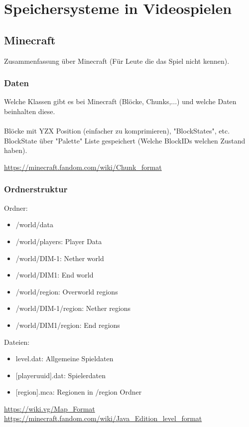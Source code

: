 \chapter{Speichersysteme in Videospielen}\label{ch:videospiele}

\section{Minecraft}
Zusammenfassung über Minecraft (Für Leute die das Spiel nicht kennen).

\subsection{Daten}
Welche Klassen gibt es bei Minecraft (Blöcke, Chunks,...) und welche Daten 
beinhalten diese.\\
\\
Blöcke mit YZX Position (einfacher zu komprimieren), "BlockStates", etc.\\
BlockState über "Palette" Liste gespeichert (Welche BlockIDs welchen Zustand haben). 

\url{https://minecraft.fandom.com/wiki/Chunk_format}

\subsection{Ordnerstruktur}
Ordner:
\begin{itemize}
    \item /world/data
    \item /world/players: Player Data
    \item /world/DIM-1: Nether world
    \item /world/DIM1: End world
    \item /world/region: Overworld regions
    \item /world/DIM-1/region: Nether regions
    \item /world/DIM1/region: End regions
\end{itemize}

Dateien:
\begin{itemize}
    \item level.dat: Allgemeine Spieldaten
    \item $[$playeruuid$]$.dat: Spielerdaten
    \item $[$region$]$.mca: Regionen in /region Ordner
\end{itemize}

\url{https://wiki.vg/Map_Format}\\
\url{https://minecraft.fandom.com/wiki/Java_Edition_level_format}

